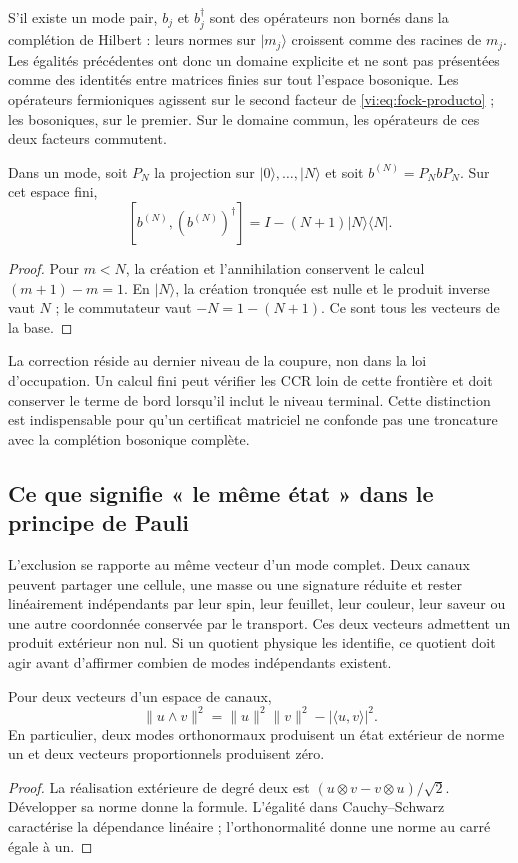 S’il existe un mode pair, \(b_j\) et \(b_j^\dagger\) sont des opérateurs
non bornés dans la complétion de Hilbert : leurs normes sur
\(|m_j\rangle\) croissent comme des racines de \(m_j\). Les égalités
précédentes ont donc un domaine explicite et ne sont pas présentées
comme des identités entre matrices finies sur tout l’espace bosonique.
Les opérateurs fermioniques agissent sur le second facteur de
\eqref{vi:eq:fock-producto} ; les bosoniques, sur le premier. Sur
le domaine commun, les opérateurs de ces deux facteurs commutent.

\begin{proposition}
\label{vi:prop:corte-bosonico}
Dans un mode, soit \(P_N\) la projection sur
\(|0\rangle,\ldots,|N\rangle\) et soit \(b^{(N)}=P_NbP_N\).
Sur cet espace fini,
\[
 [b^{(N)},(b^{(N)})^\dagger]
 =I-(N+1)|N\rangle\langle N|.
\]
\end{proposition}
\begin{proof}
Pour \(m<N\), la création et l’annihilation conservent le calcul
\((m+1)-m=1\). En \(|N\rangle\), la création tronquée est
nulle et le produit inverse vaut \(N\) ; le commutateur vaut
\(-N=1-(N+1)\). Ce sont tous les vecteurs de la base.
\end{proof}

La correction réside au dernier niveau de la coupure, non dans la loi
d’occupation. Un calcul fini peut vérifier les CCR loin de cette
frontière et doit conserver le terme de bord lorsqu’il inclut le
niveau terminal. Cette distinction est indispensable pour qu’un
certificat matriciel ne confonde pas une troncature avec la
complétion bosonique complète.

\subsection{Ce que signifie « le même état » dans le principe de Pauli}
\label{vi:subsec:pauli-etiquetas-hojas}

L’exclusion se rapporte au même vecteur d’un mode complet. Deux
canaux peuvent partager une cellule, une masse ou une signature réduite et rester
linéairement indépendants par leur spin, leur feuillet, leur couleur,
leur saveur ou une autre coordonnée conservée par le transport. Ces deux
vecteurs admettent un produit extérieur non nul. Si un quotient
physique les identifie, ce quotient doit agir avant d’affirmer
combien de modes indépendants existent.

\begin{proposition}
\label{vi:prop:pauli-gram}
Pour deux vecteurs d’un espace de canaux,
\[
 \|u\wedge v\|^2
 =\|u\|^2\|v\|^2-|\langle u,v\rangle|^2.
\]
En particulier, deux modes orthonormaux produisent un état extérieur
de norme un et deux vecteurs proportionnels produisent zéro.
\end{proposition}
\begin{proof}
La réalisation extérieure de degré deux est
\((u\otimes v-v\otimes u)/\sqrt2\). Développer sa norme donne
la formule. L’égalité dans Cauchy--Schwarz caractérise la
dépendance linéaire ; l’orthonormalité donne une norme au carré égale à un.
\end{proof}

